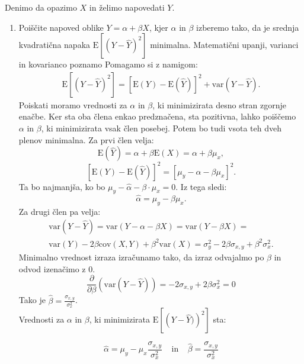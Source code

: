 \documentclass[a4paper]{article}
\begin{document}
Denimo da opazimo $X$ in želimo napovedati $Y$.
\begin{enumerate}[label=(\alph*)]
\item Poiščite napoved oblike $Y = \alpha + \beta X$, kjer $\alpha$ in $\beta$ izberemo tako, da je srednja
kvadratična napaka $ \text{E} [ ( Y - \hat{Y} ) ^2 ]$  minimalna. Matematični upanji, varianci in kovarianco poznamo
Pomagamo si z namigom:
\begin{align*} 
    \text{E} \left[ \left( Y - \hat{Y} \right) ^2 \right] = \left[ \text{E}(Y) - \text{E}(\hat{Y}) \right]^2 + \text{var}(Y - \hat{Y}).
\end{align*}
Poiskati moramo vrednosti za $\alpha$ in $\beta$, ki minimizirata desno stran zgornje enačbe. Ker sta oba člena enkao predznačena, sta pozitivna, lahko poiščemo $\alpha$ in $\beta$, ki minimizirata vsak člen posebej. Potem bo tudi vsota teh dveh plenov minimalna. Za prvi člen velja:
\begin{equation*}
\text{E}(\hat{Y}) = \alpha + \beta \text{E}(X) =  \alpha + \beta \mu_x,
\end{equation*}
\begin{equation*}
    \left[ \text{E}(Y) - \text{E}(\hat{Y}) \right]^2 = \left[ \mu_y - \alpha - \beta \mu_x \right] ^2 .
\end{equation*}
Ta bo najmanjša, ko bo $ \mu_y - \hat{\alpha} - \beta \cdot \mu_x = 0$. Iz tega sledi:
\begin{equation*}
\hat{\alpha} = \mu_y - \beta \mu_x.
\end{equation*} 
Za drugi člen pa velja:
\begin{multline*}
\text{var}(Y-\hat{Y}) = \text{var}(Y - \alpha - \beta X) = \text{var}(Y - \beta X) = \\ \text{var}(Y) - 2 \beta \text{cov}(X, Y) + \beta^2 \text{var}(X) = \sigma_y^2 - 2 \beta \sigma_{x,y} + \beta^2 \sigma_x^2.
\end{multline*}
Minimalno vrednost izraza izračunamo tako, da izraz odvajalmo po $\beta$ in odvod izenačimo z 0.
\begin{equation*}
    \frac{\partial}{\partial \beta} (\text{var}(Y - \hat{Y})) = - 2 \sigma_{x,y} + 2 \beta \sigma_x^2 = 0 
\end{equation*}
Tako je $ \hat{\beta} = \frac{\sigma_{x,y}}{\sigma_x^2} $.
\\
Vrednosti za $\alpha$ in $\beta$, ki minimizirata $\text{E} \left[ \left( Y - \hat{Y}) \right) ^2 \right]$ sta:

$$ \hat{\alpha} = \mu_y - \mu_x \frac{\sigma_{x,y}}{\sigma_x^2} \ \ \ \ \ \text{in} \ \ \ \ \ \hat{\beta} = \frac{\sigma_{x,y}}{\sigma_x^2} $$


\end{enumerate}
\end{document}
